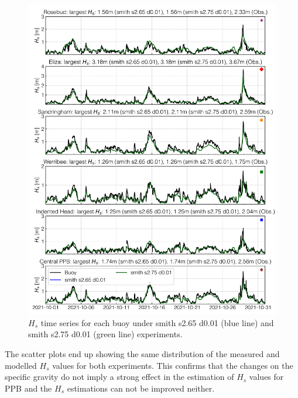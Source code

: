 \documentclass[12pt]{article}
\begin{document}
\begin{figure}[H]
    \centering
    \includegraphics[scale=0.7]{plots/hs_series/smith s2.65 d0.01_vs_smith s2.75 d0.01_vert.png}
    \caption{$H_{s}$ time series for each buoy under smith s2.65 d0.01 (blue line) and smith s2.75 d0.01 (green line) experiments.}
    \label{fig:hs_smith_s2.65_vs_smith_s2.75}
\end{figure}

The scatter plots end up showing the same distribution of the measured and modelled $H_s$ values for both experiments. This confirms that the changes on the specific gravity do not imply a strong effect in the estimation of $H_s$ values for PPB and the $H_s$ estimations can not be improved neither.
\end{document}
